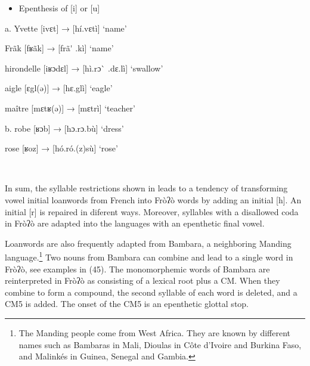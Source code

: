 \begin{itemize}
\item \begin{styleindexi}
  \label{bkm:Ref486146270}Epenthesis of [i] or [u]
\end{styleindexi}\end{itemize}
\begin{styleindexi}
  a.    Yvette             [ivɛt]              →         [hí.vɛtì]           ‘name’
\end{styleindexi}

\begin{styleindexi}
        Frãk              [fʁãk]             →         [frã\'{} .kì]           ‘name’
\end{styleindexi}

\begin{styleindexi}
        hirondelle        [iʁɔdɛl]          →         [hì.rɔ\`{} .dɛ.lì]       ‘swallow’  
\end{styleindexi}

\begin{styleindexi}
        aigle               [ɛgl(ə)]          →         [hɛ.glì]           ‘eagle’
\end{styleindexi}

\begin{styleindexi}
        maître             [mɛtʁ(ə)]        →         [mɛtrì]           ‘teacher’
\end{styleindexi}

\begin{styleindexi}
  b.    robe               [ʁɔb]              →         [hɔ.rɔ.bù]       ‘dress’
\end{styleindexi}

\begin{styleindexi}
        rose               [ʁoz]              →         [hó.ró.(z)sù]     ‘rose’
\end{styleindexi}

~

In sum, the syllable restrictions shown in  leads to a tendency of transforming vowel initial loanwords from French into Fròʔò words by adding an initial [h]. An initial [r] is repaired in diferent ways. Moreover, syllables with a disallowed coda in Fròʔò are adapted into the languages with an epenthetic final vowel.

Loanwords are also frequently adapted from Bambara, a neighboring Manding language.\footnote{The Manding people come from West Africa. They are known by different names such as Bambaras in Mali, Dioulas in Côte d'Ivoire and Burkina Faso, and Malinkés in Guinea, Senegal and Gambia.}  Two nouns from Bambara can combine and lead to a single word in Fròʔò, see examples in (45). The monomorphemic words of Bambara are reinterpreted in Fròʔò as consisting of a lexical root plus a CM. When they combine to form a compound, the second syllable of each word is deleted, and a CM5 is added. The onset of the CM5 is an epenthetic glottal stop.  

